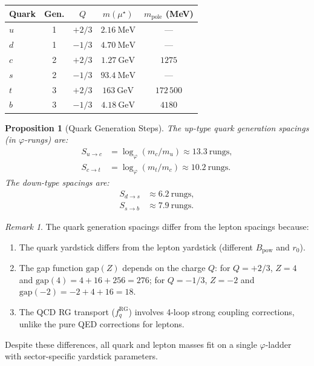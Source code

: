 \documentclass[12pt,a4paper]{article}
\newtheorem{proposition}[theorem]{Proposition}
\theoremstyle{definition}
\theoremstyle{remark}
\newtheorem{remark}[theorem]{Remark}
\begin{document}
\begin{center}
\renewcommand{\arraystretch}{1.3}
\begin{tabular}{@{}lcccc@{}}
\toprule
\textbf{Quark} & \textbf{Gen.} & \textbf{$Q$} &
\textbf{$m(\mu^\star)$} & \textbf{$m_{\mathrm{pole}}$
(MeV)} \\
\midrule
$u$ & 1 & $+2/3$ & $2.16~\mathrm{MeV}$ & --- \\
$d$ & 1 & $-1/3$ & $4.70~\mathrm{MeV}$ & --- \\
$c$ & 2 & $+2/3$ & $1.27~\mathrm{GeV}$ & $1275$ \\
$s$ & 2 & $-1/3$ & $93.4~\mathrm{MeV}$ & --- \\
$t$ & 3 & $+2/3$ & $163~\mathrm{GeV}$ & $172\,500$ \\
$b$ & 3 & $-1/3$ & $4.18~\mathrm{GeV}$ & $4180$ \\
\bottomrule
\end{tabular}
\end{center}

\begin{proposition}[Quark Generation Steps]
\label{prop:quark-steps}
The up-type quark generation spacings (in $\varphi$-rungs) are:
\begin{align}
  S_{u \to c} &= \log_\varphi(m_c / m_u)
  \approx 13.3~\text{rungs}, \\
  S_{c \to t} &= \log_\varphi(m_t / m_c)
  \approx 10.2~\text{rungs}.
\end{align}
The down-type spacings are:
\begin{align}
  S_{d \to s} &\approx 6.2~\text{rungs}, \\
  S_{s \to b} &\approx 7.9~\text{rungs}.
\end{align}
\end{proposition}

\begin{remark}
The quark generation spacings differ from the lepton spacings
because:
\begin{enumerate}[label=(\roman*)]
  \item The quark yardstick differs from the lepton yardstick
  (different $B_{\mathrm{pow}}$ and $r_0$).
  \item The gap function $\mathrm{gap}(Z)$ depends on the
  charge $Q$: for $Q = +2/3$, $Z = 4$ and
  $\mathrm{gap}(4) = 4 + 16 + 256 = 276$; for $Q = -1/3$,
  $Z = -2$ and $\mathrm{gap}(-2) = -2 + 4 + 16 = 18$.
  \item The QCD RG transport ($f_q^{\mathrm{RG}}$) involves
  4-loop strong coupling corrections, unlike the pure QED
  corrections for leptons.
\end{enumerate}
Despite these differences, all quark and lepton masses fit on a
single $\varphi$-ladder with sector-specific yardstick parameters.
\end{remark}
\end{document}

